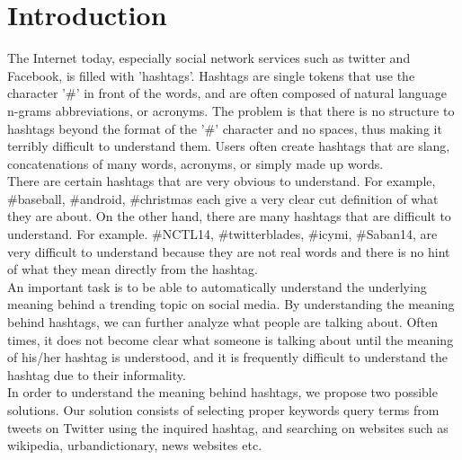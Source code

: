 \documentclass{sig-alternate}
\begin{document}
\section{Introduction}
The Internet today, especially social network services such as twitter and Facebook, is filled with 'hashtags'. Hashtags are single tokens that use the character '\#' in front of the words, and are often composed of natural language n-grams abbreviations, or acronyms. The problem is that there is no structure to hashtags beyond the format of the '\#' character and no spaces, thus making it terribly difficult to understand them. Users often create hashtags that are slang, concatenations of many words, acronyms, or simply made up words.  \\
There are certain hashtags that are very obvious to understand. For example, \#baseball, \#android, \#christmas each give a very clear cut definition of what they are about. On the other hand, there are many hashtags that are difficult to understand. For example. \#NCTL14, \#twitterblades, #icymi, \#Saban14, are very difficult to understand because they are not real words and there is no hint of what they mean directly from the hashtag.\\
An important task is to be able to automatically understand the underlying meaning behind a trending topic on social media. By understanding the meaning behind hashtags, we can further analyze what people are talking about. Often times, it does not become clear what someone is talking about until the meaning of his/her hashtag is understood, and it is frequently difficult to understand the hashtag due to their informality.\\
In order to understand the meaning behind hashtags, we propose two possible solutions. Our solution consists of selecting proper keywords query terms from tweets on Twitter using the inquired hashtag, and searching on websites such as wikipedia, urbandictionary, news websites etc.
\\
\end{document}
